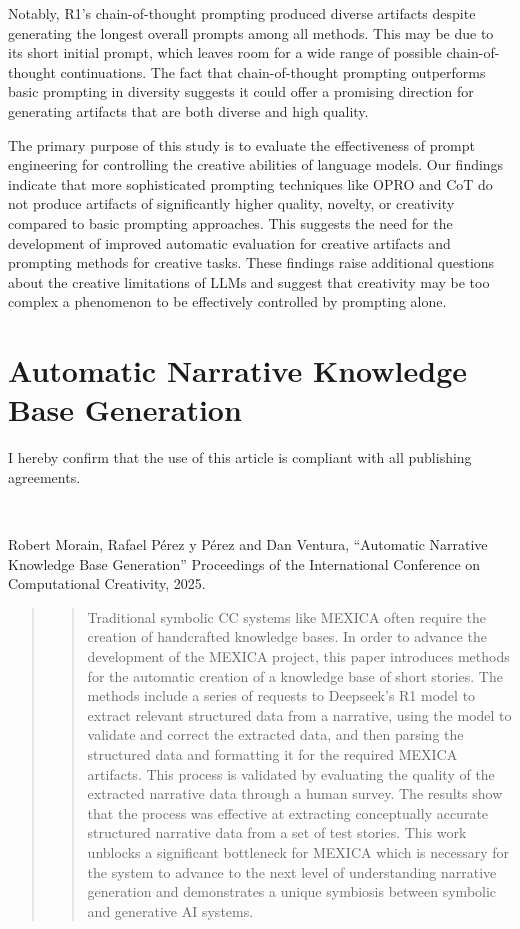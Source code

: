\documentclass[phd,electronic,oneside,twosidetoc,letterpaper,chaptercenter,parttop,lof]{byumsphd}
\begin{document}
Notably, R1’s chain-of-thought prompting produced diverse artifacts despite generating the longest overall prompts among all methods. This may be due to its short initial prompt, which leaves room for a wide range of possible chain-of-thought continuations. The fact that chain-of-thought prompting outperforms basic prompting in diversity suggests it could offer a promising direction for generating artifacts that are both diverse and high quality.

The primary purpose of this study is to evaluate the effectiveness of prompt engineering for controlling the creative abilities of language models. Our findings indicate that more sophisticated prompting techniques like OPRO and CoT do not produce artifacts of significantly higher quality, novelty, or creativity compared to basic prompting approaches. This suggests the need for the development of improved automatic evaluation for creative artifacts and prompting methods for creative tasks. These findings raise additional questions about the creative limitations of LLMs and suggest that creativity may be too complex a phenomenon to be effectively controlled by prompting alone.

\chapter{Automatic Narrative Knowledge Base Generation}

I hereby confirm that the use of this article is compliant with all publishing agreements.

\

\noindent
Robert Morain, Rafael Pérez y Pérez and Dan Ventura, ``Automatic Narrative Knowledge Base Generation'' Proceedings of the International Conference on Computational Creativity, 2025.

\begin{abstract}
\begin{quote}

Traditional symbolic CC systems like MEXICA often require the creation of handcrafted knowledge bases. In order to advance the development of the MEXICA project, this paper introduces methods for the automatic creation of a knowledge base of short stories. The methods include a series of requests to Deepseek's R1 model to extract relevant structured data from a narrative, using the model to validate and correct the extracted data, and then parsing the structured data and formatting it for the required MEXICA artifacts. This process is validated by evaluating the quality of the extracted narrative data through a human survey. The results show that the process was effective at extracting conceptually accurate structured narrative data from a set of test stories. This work unblocks a significant bottleneck for MEXICA which is necessary for the system to advance to the next level of understanding narrative generation and demonstrates a unique symbiosis between symbolic and generative AI systems.

\end{quote}
\end{abstract}
\end{document}
